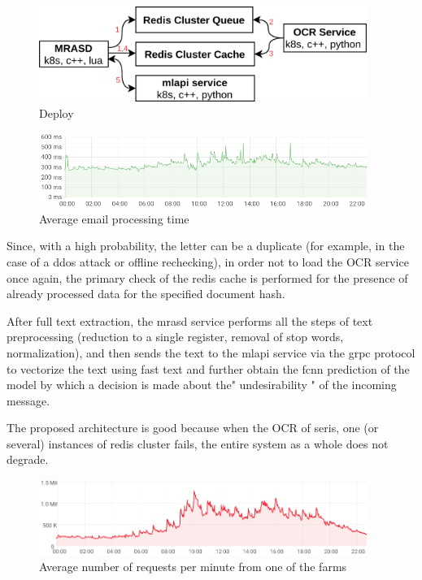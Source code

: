 \documentclass[12pt]{jpconf}
\begin{document}
\begin{figure}[t]
	\center
	\includegraphics[width=0.95\textwidth]{images/deploy.jpg}
	\caption{\label{fig:02} Deploy}
\end{figure}

\begin{figure}[b]
	\center
	\includegraphics[width=0.95\textwidth]{images/timings.png}
	\caption{\label{fig:03} Average email processing time}	
\end{figure}


Since, with a high probability, the letter can be a duplicate (for example, in the case of a ddos attack or offline rechecking), in order not to load the OCR service once again, the primary check of the redis cache is performed for the presence of already processed data for the specified document hash.

After full text extraction, the mrasd service performs all the steps of text preprocessing (reduction to a single register, removal of stop words, normalization), and then sends the text to the mlapi service via the grpc protocol to vectorize the text using fast text and further obtain the fcnn prediction of the model by which a decision is made about the" undesirability " of the incoming message.

The proposed architecture is good because when the OCR of seris, one (or several) instances of redis cluster fails, the entire system as a whole does not degrade.
 
\begin{figure}[t]
	\center
	\includegraphics[width=0.95\textwidth]{images/processed_messages.png}
	\caption{\label{fig:04} Average number of requests per minute from one of the farms}
\end{figure}
\end{document}
